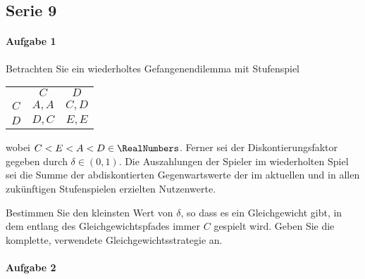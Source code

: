 \subsection{Serie 9}%
\label{sub:serie_9}

\paragraph{Aufgabe 1}%
\label{par:serie_9_aufgabe_1}

Betrachten Sie ein wiederholtes Gefangenendilemma mit Stufenspiel
\begin{center}
  \begin{tabular}{ccc}
    & $C$ & $D$\\
    \cmidrule{2-3}
    $C$ & $A,A$ & $C,D$\\
    \cmidrule{2-3}
    $D$ & $D,C$ & $E,E$\\
    \cmidrule{2-3}
  \end{tabular}
\end{center}
wobei $C<E<A<D \in \RealNumbers$.
Ferner sei der Diskontierungsfaktor gegeben durch $δ \in (0,1)$.
Die Auszahlungen der Spieler im wiederholten Spiel sei die Summe der abdiskontierten
Gegenwartswerte der im aktuellen und in allen zukünftigen Stufenspielen erzielten
Nutzenwerte.

Bestimmen Sie den kleinsten Wert von $δ$, so dass es ein Gleichgewicht gibt,
in dem entlang des Gleichgewichtspfades immer $C$ gespielt wird.
Geben Sie die komplette, verwendete Gleichgewichtsstrategie an.

\paragraph{Aufgabe 2}%
\label{par:serie_9_aufgabe_2}

